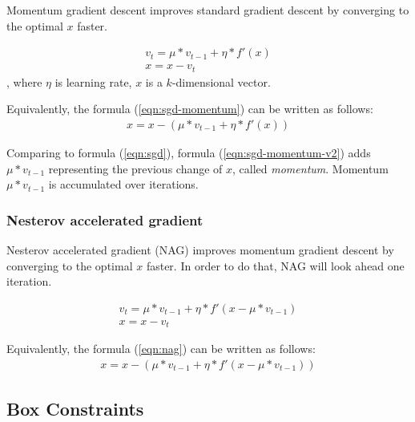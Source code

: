 \documentclass[12pt]{article}
\begin{document}
Momentum gradient descent improves standard gradient descent by converging to the optimal $x$ faster. 

\begin{equation}
\begin{split}
\label{eqn:sgd-momentum}
v_{t} = \mu * v_{t-1} + \eta * f'(x)
\\
x = x - v_t
\end{split}
\end{equation}
, where $\eta$ is learning rate, $x$ is a $k$-dimensional vector.

Equivalently, the formula (\ref{eqn:sgd-momentum}) can be written as follows:
\begin{equation}
\begin{split}
\label{eqn:sgd-momentum-v2}
x = x - (\mu * v_{t-1} + \eta * f'(x))
\end{split}
\end{equation}

Comparing to formula (\ref{eqn:sgd}), formula (\ref{eqn:sgd-momentum-v2}) adds $\mu * v_{t-1} $ representing the previous change of $x$, called \textit{momentum}. Momentum $\mu * v_{t-1} $ is accumulated over iterations.

\subsubsection{Nesterov accelerated gradient}

Nesterov accelerated gradient (NAG) improves momentum gradient descent by converging to the optimal $x$ faster. In order to do that, NAG will look ahead one iteration.

\begin{equation}
\begin{split}
\label{eqn:nag}
v_{t} = \mu * v_{t-1} + \eta * f'(x - \mu * v_{t-1})
\\
x = x - v_t
\end{split}
\end{equation}

Equivalently, the formula (\ref{eqn:nag}) can be written as follows:
\begin{equation}
\begin{split}
\label{eqn:sgd-momentum-v2}
x = x - (\mu * v_{t-1} + \eta * f'(x - \mu * v_{t-1}))
\end{split}
\end{equation}

\subsection{Box Constraints}
\end{document}
